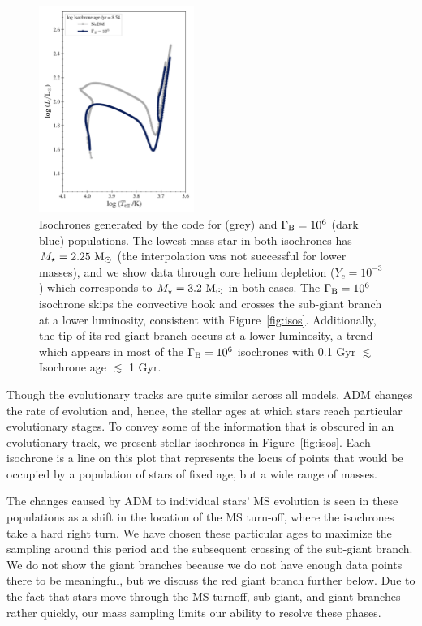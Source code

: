 \documentclass[useAMS,usenatbib]{mnras}
\begin{document}
\begin{figure}
    \centering
    \includegraphics[width=0.45\textwidth]{plots/iso_Dotter.png}
    \caption{Isochrones generated by the \mist code for \nodm (grey) and $\Gamma_\mathrm{B} = 10^{6}$ (dark blue) populations. The lowest mass star in both isochrones has $M_{\star} = 2.25 \ \mathrm{M}_{\odot}$ (the interpolation was not successful for lower masses), and we show data through core helium depletion ($Y_c = 10^{-3}$) which corresponds to $M_{\star} = 3.2 \ \mathrm{M}_{\odot}$ in both cases.
    The $\Gamma_\mathrm{B} = 10^{6}$ isochrone skips the convective hook and crosses the sub-giant branch at a lower luminosity, consistent with Figure~\ref{fig:isos}. Additionally, the tip of its red giant branch occurs at a lower luminosity, a trend which appears in most of the $\Gamma_\mathrm{B} = 10^{6}$ \mist isochrones with 0.1 Gyr $\lesssim$ Isochrone age $\lesssim$ 1 Gyr.}
    \label{fig:isoDot}
\end{figure}


Though the evolutionary tracks are quite similar across all models, 
ADM changes the rate of evolution and, hence, the stellar ages at 
which stars reach particular evolutionary stages. To convey some 
of the information that is obscured in an evolutionary track, 
we present stellar isochrones in Figure~\ref{fig:isos}. Each isochrone is a line on this plot 
that represents the locus of points that would be occupied by a 
population of stars of fixed age, but a wide range of masses. 

The changes caused by ADM to individual stars' MS evolution is seen in these populations as a shift in the location of the MS turn-off, where the isochrones take a hard right turn. We have chosen these particular ages to maximize the sampling around this period and the subsequent crossing of the sub-giant branch. We do not show the giant branches because we do not have enough data points there to be meaningful, but we discuss the red giant branch further below. Due to the fact that stars move through the MS turnoff, sub-giant, and giant branches rather quickly, our mass sampling limits our ability to resolve these phases.
\end{document}
